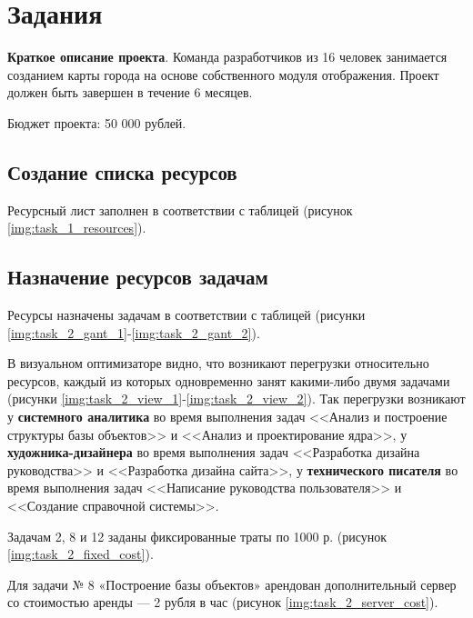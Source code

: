 \chapter{Задания}

\textbf{Краткое описание проекта}. Команда разработчиков из 16 человек занимается созданием карты
города на основе собственного модуля отображения. Проект должен быть завершен в течение
6 месяцев. 

Бюджет проекта: 50 000 рублей.

\section{Создание списка ресурсов}

Ресурсный лист заполнен в соответствии с таблицей (рисунок \ref{img:task_1_resources}).

\section{Назначение ресурсов задачам}

Ресурсы назначены задачам 
в соответствии с таблицей (рисунки \ref{img:task_2_gant_1}-\ref{img:task_2_gant_2}).

В визуальном оптимизаторе видно, что возникают перегрузки относительно ресурсов, каждый из которых
одновременно занят какими-либо двумя задачами (рисунки \ref{img:task_2_view_1}-\ref{img:task_2_view_2}).
Так перегрузки возникают у \textbf{системного аналитика} во время выполнения задач <<Анализ и построение структуры базы объектов>> и <<Анализ и проектирование ядра>>, у \textbf{художника-дизайнера} во время выполнения задач <<Разработка дизайна руководства>> и <<Разработка дизайна сайта>>, у \textbf{технического писателя} во время выполнения задач <<Написание руководства пользователя>> и <<Создание справочной системы>>.

Задачам 2, 8 и 12 заданы фиксированные траты по 1000 р. (рисунок \ref{img:task_2_fixed_cost}).

Для задачи № 8 «Построение базы объектов» арендован дополнительный 
сервер со стоимостью аренды --- 2 рубля в час
(рисунок \ref{img:task_2_server_cost}).

